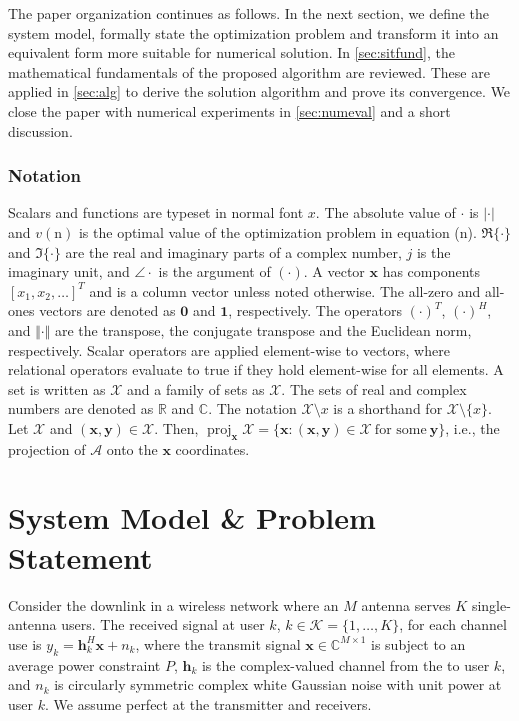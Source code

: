 \documentclass[a4paper,10pt,journal]{IEEEtran}
\DeclareMathOperator\proj{proj}
\let\vec\bm
\begin{document}
The paper organization continues as follows. In the next section, we define the system model, formally state the optimization problem and transform it into an equivalent form more suitable for numerical solution. In \cref{sec:sitfund}, the mathematical fundamentals of the proposed algorithm are reviewed. These are applied in \cref{sec:alg} to derive the solution algorithm and prove its convergence. We close the paper with numerical experiments in \cref{sec:numeval} and a short discussion.%

\subsubsection*{Notation}
Scalars and functions are typeset in normal font $x$.
The absolute value of $\cdot$ is $|\cdot|$ and $v(\text{n})$ is the optimal value of the optimization problem in equation (n).
$\Re\{\cdot\}$ and $\Im\{\cdot\}$ are the real and imaginary parts of a complex number, $j$ is the imaginary unit, and $\angle\cdot$ is the argument of $(\cdot)$.
%
A vector $\vec x$ has components $[x_1, x_2, \dots]^T$ and is a column vector unless noted otherwise. The all-zero and all-ones vectors are denoted as $\vec 0$ and $\vec 1$, respectively. The operators
$(\cdot)^T$,
$(\cdot)^H$, and
$\Vert\cdot\Vert$
are the transpose, the conjugate transpose and the Euclidean norm, respectively. Scalar operators are applied element-wise to vectors, where relational operators evaluate to true if they hold element-wise for all elements.
%
A set is written as $\mathcal X$ and a family of sets as $\mathscr X$. The sets of real and complex numbers are denoted as $\mathds R$ and $\mathds C$.
The notation $\mathcal X\setminus x$ is a shorthand for $\mathcal X\setminus\{x\}$.
Let $\mathcal X$ and $(\vec x, \vec y)\in\mathcal X$. Then, $\proj_{\vec x} \mathcal X = \{ \vec x : (\vec x, \vec y)\in\mathcal X\ \text{for some}\ \vec y\}$, i.e., the projection of $\mathcal A$ onto the $\vec x$ coordinates.



\section{System Model \& Problem Statement}\label{sec:sysmod}


Consider the downlink in a wireless network where an $M$ antenna  serves $K$ single-antenna users. The received signal at user $k$, $k\in\mathcal K = \{ 1, \dots, K \}$, for each channel use is
$y_k=\vec{h}_k^{H}\vec{x}+n_k$,
where the transmit signal $\vec x\in\mathds{C}^{M\times 1}$ is subject to an average power constraint $P$, $\vec h_k$ is the complex-valued channel from the  to user $k$, and $n_k$ is circularly symmetric complex white Gaussian noise with unit power at user $k$. We assume perfect  at the transmitter and receivers.
\end{document}
